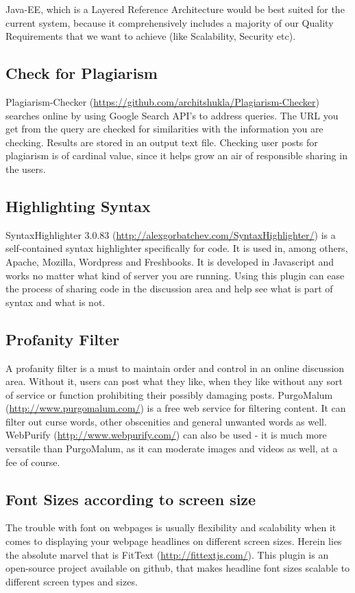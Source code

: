 \documentclass[hidelinks, 12pt]{article}
\begin{document}
Java-EE, which is a Layered Reference Architecture would be best suited for the current system, because it comprehensively includes a majority of our Quality Requirements that we want to achieve (like Scalability, Security etc).

\subsection{Check for Plagiarism}
Plagiarism-Checker (\url{https://github.com/architshukla/Plagiarism-Checker}) searches online by using Google Search API's to address queries. The URL you get from the query are checked for similarities with the information you are checking. Results are stored in an output text file. Checking user posts for plagiarism is of cardinal value, since it helps grow an air of responsible sharing in the users.
\subsection{Highlighting Syntax}
SyntaxHighlighter 3.0.83 (\url{http://alexgorbatchev.com/SyntaxHighlighter/}) is a self-contained syntax highlighter specifically for code. It is used in, among others, Apache, Mozilla, Wordpress and Freshbooks. It is developed in Javascript and works no matter what kind of server you are running. Using this plugin can ease the process of sharing code in the discussion area and help see what is part of syntax and what is not.
\subsection{Profanity Filter}
A profanity filter is a must to maintain order and control in an online discussion area. Without it, users can post what they like, when they like without any sort of service or function prohibiting their possibly damaging posts. PurgoMalum (\url{http://www.purgomalum.com/}) is a free web service for filtering content. It can filter out curse words, other obscenities and general unwanted words as well. WebPurify (\url{http://www.webpurify.com/}) can also be used - it is much more versatile than PurgoMalum, as it can moderate images and videos as well, at a fee of course.
\subsection{Font Sizes according to screen size}
The trouble with font on webpages is usually flexibility and scalability when it comes to displaying your webpage headlines on different screen sizes. Herein lies the absolute marvel that is FitText (\url{http://fittextjs.com/}). This plugin is an open-source project available on github, that makes headline font sizes scalable to different screen types and sizes.
\end{document}
